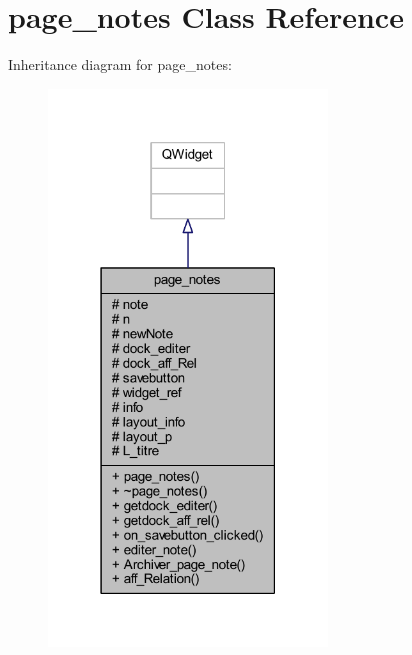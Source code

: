 \hypertarget{classpage__notes}{}\section{page\+\_\+notes Class Reference}
\label{classpage__notes}


Inheritance diagram for page\+\_\+notes\+:
\nopagebreak
\begin{figure}[H]
\begin{center}
\leavevmode
\includegraphics[width=210pt]{classpage__notes__inherit__graph}
\end{center}
\end{figure}


